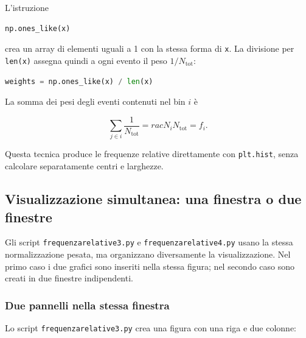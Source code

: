\documentclass[11pt,a4paper]{book}
\begin{document}
L'istruzione

\begin{lstlisting}[language=Python]
np.ones_like(x)
\end{lstlisting}

crea un array di elementi uguali a 1 con la stessa forma di \texttt{x}.
La divisione per \texttt{len(x)} assegna quindi a ogni evento il peso
$1/N_{\mathrm{tot}}$:

\begin{lstlisting}[language=Python]
weights = np.ones_like(x) / len(x)
\end{lstlisting}

La somma dei pesi degli eventi contenuti nel bin $i$ è

\begin{equation}
\sum_{j\in i}\frac{1}{N_{\mathrm{tot}}}
=rac{N_i}{N_{\mathrm{tot}}}=f_i.
\end{equation}

Questa tecnica produce le frequenze relative direttamente con
\texttt{plt.hist}, senza calcolare separatamente centri e larghezze.

\subsection{Visualizzazione simultanea: una finestra o due finestre}

Gli script \texttt{frequenzarelative3.py} e
\texttt{frequenzarelative4.py} usano la stessa normalizzazione pesata,
ma organizzano diversamente la visualizzazione. Nel primo caso i due
grafici sono inseriti nella stessa figura; nel secondo caso sono creati
in due finestre indipendenti.

\subsubsection{Due pannelli nella stessa finestra}

Lo script \texttt{frequenzarelative3.py} crea una figura con una riga e
due colonne:
\end{document}
